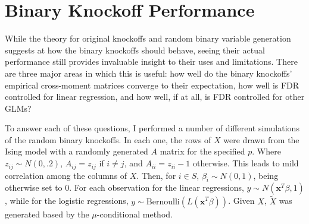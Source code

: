 \documentclass[11pt]{article}
\theoremstyle{definition}
\begin{document}
\section{Binary Knockoff Performance}
    While the theory for original knockoffs and random binary variable generation suggests at how the binary knockoffs should behave, seeing their actual performance still provides invaluable insight to their uses and limitations. There are three major areas in which this is useful: how well do the binary knockoffs' empirical cross-moment matrices converge to their expectation, how well is FDR controlled for linear regression, and how well, if at all, is FDR controlled for other GLMs? \par
    To answer each of these questions, I performed a number of different simulations of the random binary knockoffs. In each one, the rows of $X$ were drawn from the Ising model with a randomly generated $A$ matrix for the specified $p$. Where $z_{ij}\sim N(0,.2)$, $A_{ij}=z_{ij}$ if $i\neq j$, and $A_{ii}=z_{ii}-1$ otherwise. This leads to mild correlation among the columns of $X$. Then, for $i\in S$, $\beta_i\sim N(0,1)$, being otherwise set to $0$. For each observation for the linear regressions, $y\sim N(\mathbf{x}^T\beta,1)$, while for the logistic regressions, $y\sim \textrm{Bernoulli}(L(\mathbf{x}^T\beta))$. Given $X$, $\tilde X$ was generated based by the $\mu$-conditional method.
\end{document}
